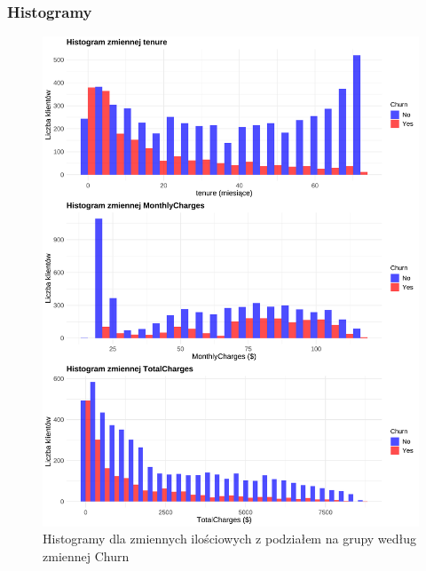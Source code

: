 \documentclass[12pt, a4paper]{article}\usepackage[]{graphicx}\usepackage[]{xcolor}
\makeatletter
\def\maxwidth{ %
  \ifdim\Gin@nat@width>\linewidth
    \linewidth
  \else
    \Gin@nat@width
  \fi
}
\newenvironment{knitrout}{}{} %
\makeatother
\begin{document}
\subsubsection{Histogramy}
\begin{knitrout}
\color{fgcolor}\begin{figure}[H]

{\centering \includegraphics[width=\maxwidth]{figure/histogramy-churn-1} 

}

\caption[Histogramy dla zmiennych ilościowych z podziałem na grupy według zmiennej Churn]{Histogramy dla zmiennych ilościowych z podziałem na grupy według zmiennej Churn}\label{fig:histogramy-churn}
\end{figure}

\end{knitrout}


\newpage
\end{document}

